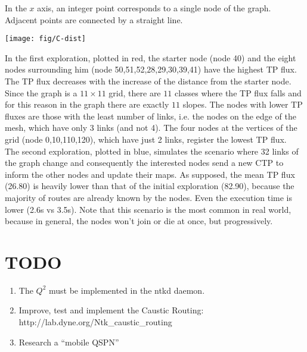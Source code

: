 \documentclass[a4paper]{article}
\newcommand{\href}[2]{ #1 }
\begin{document}
In the $x$ axis, an integer point corresponds to a single node of the graph.
Adjacent points are connected by a straight line.\\
\begin{center}
\label{fig:C-dist}
\texttt{[image: fig/C-dist]}
\end{center}
In the first exploration, plotted in red, the starter node (node 40) and the eight nodes
surrounding him (node 50,51,52,28,29,30,39,41) have the highest TP flux. The TP flux decreases with the
increase of the distance from the starter node. Since the graph is a
$11\times11$ grid, there are $11$ classes where the TP flux falls and for this
reason in the graph there are exactly $11$ slopes. The nodes with lower TP fluxes are
those with the least number of links, i.e. the nodes on the edge of the mesh,
which have only 3 links (and not 4). The four nodes at the vertices of the
grid (node 0,10,110,120), which have just 2
links, register the lowest TP flux.\\
The second exploration, plotted in blue, simulates the scenario where 32 links of the graph
change and consequently the interested nodes send a new CTP to inform the
other nodes and update their maps. As supposed, the mean TP flux (26.80) is heavily
lower than that of the initial exploration (82.90), because the majority of
routes are already known by the nodes. Even the execution time is lower (2.6s
vs 3.5s). Note that this scenario is the most common in real world, because
in general, the nodes won't join or die at once, but progressively.


\section{TODO}
\begin{enumerate}
	\item The $Q^2$ must be implemented in the ntkd daemon.
	\item Improve, test and implement the Caustic Routing:
		\href{http://lab.dyne.org/Ntk\_caustic\_routing}{RFC 0013}
	\item Research a ``mobile QSPN''
\end{enumerate}
\end{document}
